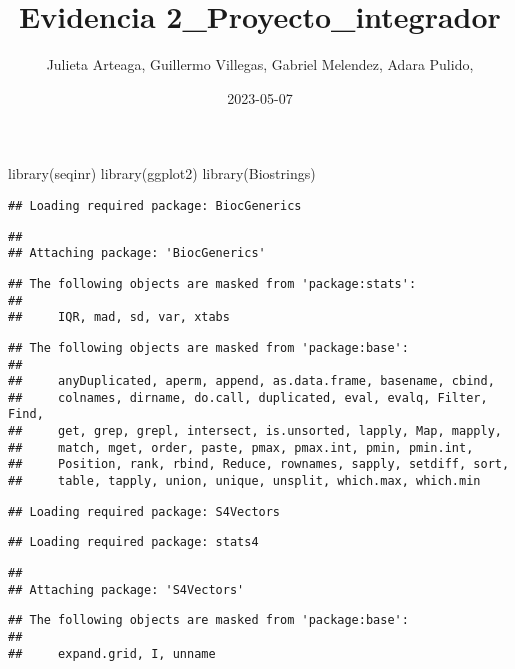 \documentclass[
]{article}
\title{Evidencia 2\_Proyecto\_integrador}
\author{Julieta Arteaga, Guillermo Villegas, Gabriel Melendez, Adara
Pulido,}
\date{2023-05-07}
\newenvironment{Shaded}{\begin{snugshade}}{\end{snugshade}}
\newcommand{\FunctionTok}[1]{\textcolor[rgb]{0.00,0.00,0.00}{#1}}
\newcommand{\NormalTok}[1]{#1}
\begin{document}
\maketitle

\begin{Shaded}
\begin{Highlighting}[]
\FunctionTok{library}\NormalTok{(seqinr)}
\FunctionTok{library}\NormalTok{(ggplot2)}
\FunctionTok{library}\NormalTok{(Biostrings)}
\end{Highlighting}
\end{Shaded}

\begin{verbatim}
## Loading required package: BiocGenerics
\end{verbatim}

\begin{verbatim}
## 
## Attaching package: 'BiocGenerics'
\end{verbatim}

\begin{verbatim}
## The following objects are masked from 'package:stats':
## 
##     IQR, mad, sd, var, xtabs
\end{verbatim}

\begin{verbatim}
## The following objects are masked from 'package:base':
## 
##     anyDuplicated, aperm, append, as.data.frame, basename, cbind,
##     colnames, dirname, do.call, duplicated, eval, evalq, Filter, Find,
##     get, grep, grepl, intersect, is.unsorted, lapply, Map, mapply,
##     match, mget, order, paste, pmax, pmax.int, pmin, pmin.int,
##     Position, rank, rbind, Reduce, rownames, sapply, setdiff, sort,
##     table, tapply, union, unique, unsplit, which.max, which.min
\end{verbatim}

\begin{verbatim}
## Loading required package: S4Vectors
\end{verbatim}

\begin{verbatim}
## Loading required package: stats4
\end{verbatim}

\begin{verbatim}
## 
## Attaching package: 'S4Vectors'
\end{verbatim}

\begin{verbatim}
## The following objects are masked from 'package:base':
## 
##     expand.grid, I, unname
\end{verbatim}
\end{document}
